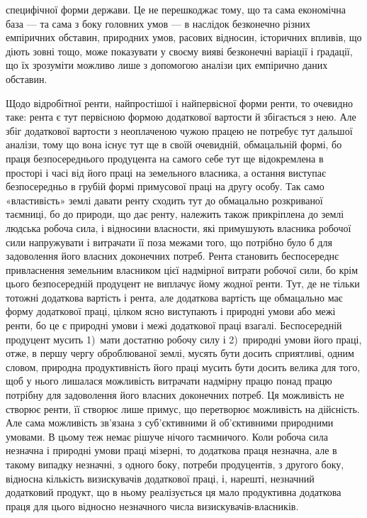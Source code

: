 \parcont{}  %
специфічної форми держави. Це не перешкоджає тому, що та сама економічна
база — та сама з боку головних умов — в наслідок безконечно різних емпіричних
обставин, природних умов, расових відносин, історичних впливів, що діють
зовні тощо, може показувати у своєму вияві безконечні варіації і ґрадації, що
їх зрозуміти можливо лише з допомогою аналізи цих емпірично даних обставин.

Щодо відробітної ренти, найпростішої і найпервісної форми ренти, то очевидно
таке: рента є тут первісною формою додаткової вартости й збігається з
нею. Але збіг додаткової вартости з неоплаченою чужою працею не потребує
тут дальшої аналізи, тому що вона існує тут ще в своїй очевидній, обмацальній
формі, бо праця безпосереднього продуцента на самого себе тут ще відокремлена
в просторі і часі від його праці на земельного власника, а остання виступає
безпосередньо в грубій формі примусової праці на другу особу. Так само «властивість»
землі давати ренту сходить тут до обмацально розкриваної таємниці, бо до
природи, що дає ренту, належить також прикріплена до землі людська робоча сила,
і відносини власности, які примушують власника робочої сили напружувати і витрачати
її поза межами того, що потрібно було б для задоволення його власних
доконечних потреб. Рента становить беспосереднє привласнення земельним
власником цієї надмірної витрати робочої сили, бо крім цього безпосередній
продуцент не виплачує йому жодної ренти. Тут, де не тільки тотожні додаткова
вартість і рента, але додаткова вартість ще обмацально має форму додаткової праці,
цілком ясно виступають і природні умови або межі ренти, бо це є природні
умови і межі додаткової праці взагалі. Беспосередній продуцент
мусить 1)~мати достатню робочу силу і 2)~природні умови його праці, отже,
в першу чергу оброблюваної землі, мусять бути досить сприятливі, одним
словом, природна продуктивність його праці мусить бути досить велика для
того, щоб у нього лишалася можливість витрачати надмірну працю понад працю
потрібну для задоволення його власних доконечних потреб. Ця можливість не
створює ренти, її створює лише примус, що перетворює можливість на дійсність.
Але сама можливість зв’язана з суб’єктивними й об’єктивними природними
умовами. В цьому теж немає рішуче нічого таємничого. Коли робоча сила незначна
і природні умови праці мізерні, то додаткова праця незначна, але в
такому випадку незначні, з одного боку, потреби продуцентів, з другого боку,
відносна кількість визискувачів додаткової праці, і, нарешті, незначний додатковий
продукт, що в ньому реалізується ця мало продуктивна додаткова праця для
цього відносно незначного числа визискувачів-власників.

